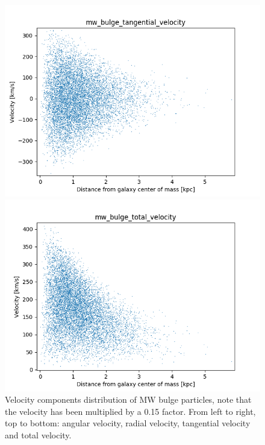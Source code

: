 \documentclass[a4paper,12pt, english]{article}
\begin{document}
\begin{figure}[!h]
\begin{minipage}{0.45\textwidth}
  \centering
\includegraphics[width=1\textwidth]{VelocityDistr/mw_bulge_tangential_velocity.png}
\end{minipage}
\begin{minipage}{0.45\textwidth}
  \centering
\includegraphics[width=1\textwidth]{VelocityDistr/mw_bulge_total_velocity.png}
\end{minipage}
\caption{Velocity components distribution of MW bulge particles, note that the velocity has been multiplied by a 0.15 factor. From left to right, top to bottom: angular velocity, radial velocity, tangential velocity and total velocity.}
\label{fig:bulge-vel}
\end{figure}
\end{document}
